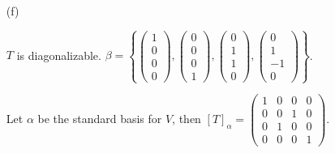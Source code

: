 \begin{Exercise}
	\begin{enumerate}[(a)]
		\item[(f)]
		\begin{answer}
			$T$ is diagonalizable. $\beta = \left\{\begin{pmatrix}
			1 \\
			0 \\
			0 \\
			0
			\end{pmatrix},\begin{pmatrix}
			0 \\
			0 \\
			0 \\
			1
			\end{pmatrix},\begin{pmatrix}
			0 \\
			1 \\
			1 \\
			0
			\end{pmatrix},\begin{pmatrix}
			0 \\
			1 \\
			-1 \\
			0
			\end{pmatrix}\right\}$.
		\end{answer}
		\begin{solution}
			Let $\alpha$ be the standard basis for $V$, then $[T]_{\alpha} = \begin{pmatrix}
			1 & 0 & 0 & 0 \\
			0 & 0 & 1 & 0 \\
			0 & 1 & 0 & 0 \\
			0 & 0 & 0 & 1
			\end{pmatrix}$.
			

\end{solution}
\end{enumerate}
\end{Exercise}
